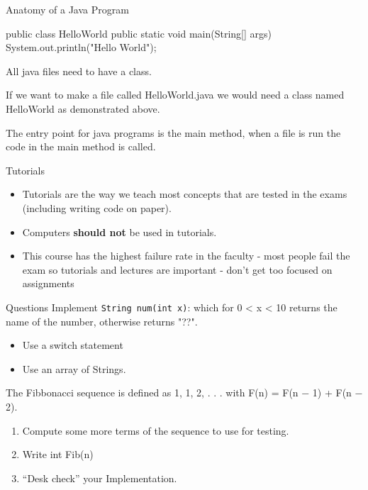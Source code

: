 \documentclass[week2]{csse2002}
\begin{document}
\begin{topic}{Anatomy of a Java Program}
\begin{java}
public class HelloWorld {
    public static void main(String[] args) {
        System.out.println("Hello World");
    }
}
\end{java}

All java files need to have a class.

If we want to make a file called HelloWorld.java we would need a class named HelloWorld as demonstrated above.

The entry point for java programs is the main method, when a file is run the code in the main method is called.
\end{topic}

\begin{topic}{Tutorials}
\begin{itemize}
\item Tutorials are the way we teach most concepts that are tested in the exams (including writing code on paper).

\item Computers \textbf{should not} be used in tutorials.

\item This course has the highest failure rate in the faculty - most people fail the exam so tutorials and lectures are important - don't get too focused on assignments
\end{itemize}
\end{topic}

\begin{topic}{Questions}
Implement \texttt{String num(int x)}: which for 0 < x < 10 returns the name of the number, otherwise returns "??".
\begin{itemize}
	\item Use a switch statement
	\item Use an array of Strings.
\end{itemize}

The Fibbonacci sequence is defined as 1, 1, 2, . . . with F(n) = F(n − 1) + F(n − 2).
\begin{enumerate}
	\item Compute some more terms of the sequence to use for testing.
	\item Write int Fib(n)
	\item “Desk check” your Implementation.
\end{enumerate}
\end{topic}
\end{document}
